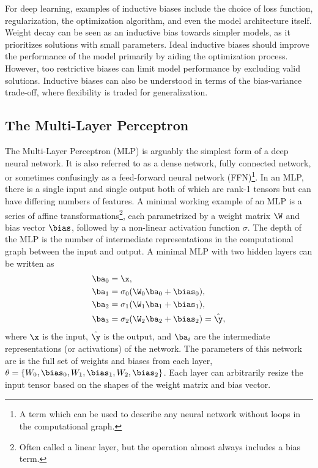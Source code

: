 For deep learning, examples of inductive biases include the choice of loss function, regularization, the optimization algorithm, and even the model architecture itself.
Weight decay can be seen as an inductive bias towards simpler models, as it prioritizes solutions with small parameters.
Ideal inductive biases should improve the performance of the model primarily by aiding the optimization process.
However, too restrictive biases can limit model performance by excluding valid solutions.
Inductive biases can also be understood in terms of the bias-variance trade-off, where flexibility is traded for generalization.

\subsection{The Multi-Layer Perceptron}

The Multi-Layer Perceptron (MLP) is arguably the simplest form of a deep neural network.
It is also referred to as a dense network, fully connected network, or sometimes confusingly as a feed-forward neural network (FFN)\footnote{A term which can be used to describe any neural network without loops in the computational graph.}.
In an MLP, there is a single input and single output both of which are rank-1 tensors but can have differing numbers of features.
A minimal working example of an MLP is a series of affine transformations\footnote{Often called a linear layer, but the operation almost always includes a bias term.}, each parametrized by a weight matrix $\W$ and bias vector $\bias$, followed by a non-linear activation function $\sigma$.
The depth of the MLP is the number of intermediate representations in the computational graph between the input and output.
A minimal MLP with two hidden layers can be written as
\begin{align}
    \ba_0 &= \x, \\
    \ba_1 &= \sigma_0(\W_0 \ba_0 + \bias_0), \\
    \ba_2 &= \sigma_1(\W_1 \ba_1 + \bias_1), \\
    \ba_3 &= \sigma_2(\W_2 \ba_2 + \bias_2) = \hat{\y},
\end{align}
where $\x$ is the input, $\hat{\y}$ is the output, and $\ba_i$ are the intermediate representations (or activations) of the network.
The parameters of this network are is the full set of weights and biases from each layer, $\theta = \{W_0, \bias_0, W_1, \bias_1, W_2, \bias_2\}$.
Each layer can arbitrarily resize the input tensor based on the shapes of the weight matrix and bias vector.

